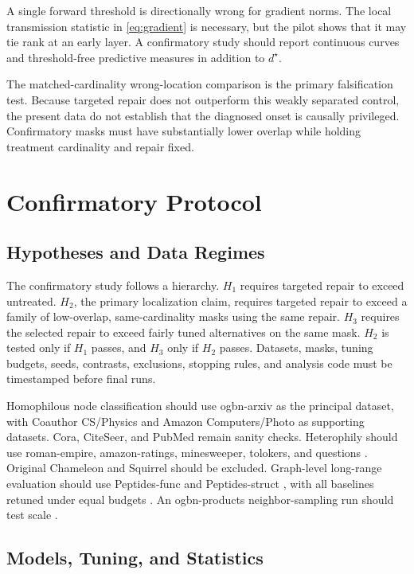 \documentclass[journal]{IEEEtran}
\begin{document}
A single forward threshold is directionally wrong for gradient norms. The local transmission statistic in \eqref{eq:gradient} is necessary, but the pilot shows that it may tie rank at an early layer. A confirmatory study should report continuous curves and threshold-free predictive measures in addition to $d^\star$.

The matched-cardinality wrong-location comparison is the primary falsification test. Because targeted repair does not outperform this weakly separated control, the present data do not establish that the diagnosed onset is causally privileged. Confirmatory masks must have substantially lower overlap while holding treatment cardinality and repair fixed.

\section{Confirmatory Protocol}

\subsection{Hypotheses and Data Regimes}

The confirmatory study follows a hierarchy. $H_1$ requires targeted repair to exceed untreated. $H_2$, the primary localization claim, requires targeted repair to exceed a family of low-overlap, same-cardinality masks using the same repair. $H_3$ requires the selected repair to exceed fairly tuned alternatives on the same mask. $H_2$ is tested only if $H_1$ passes, and $H_3$ only if $H_2$ passes. Datasets, masks, tuning budgets, seeds, contrasts, exclusions, stopping rules, and analysis code must be timestamped before final runs.

Homophilous node classification should use ogbn-arxiv as the principal dataset, with Coauthor CS/Physics and Amazon Computers/Photo as supporting datasets. Cora, CiteSeer, and PubMed remain sanity checks. Heterophily should use roman-empire, amazon-ratings, minesweeper, tolokers, and questions \cite{platonov2023heterophily}. Original Chameleon and Squirrel should be excluded. Graph-level long-range evaluation should use Peptides-func and Peptides-struct \cite{dwivedi2022lrgb}, with all baselines retuned under equal budgets \cite{tonshoff2023gap}. An ogbn-products neighbor-sampling run should test scale \cite{hu2020ogb}.

\subsection{Models, Tuning, and Statistics}
\end{document}
